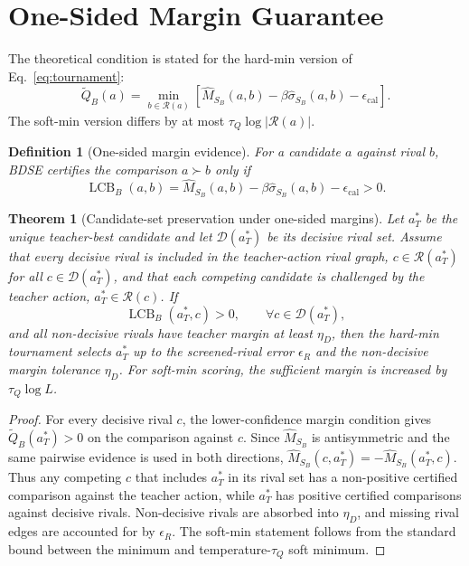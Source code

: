 \documentclass{article}
\newtheorem{theorem}{Theorem}
\newtheorem{definition}{Definition}
\newcommand{\R}{\mathcal{R}}
\begin{document}
\section{One-Sided Margin Guarantee}
\label{app:proof}

The theoretical condition is stated for the hard-min version of Eq.~\eqref{eq:tournament}:
\begin{equation}
\tilde Q_B(a)=\min_{b\in\R(a)}
\left[
\hat M_{S_B}(a,b)-\beta\hat\sigma_{S_B}(a,b)-\epsilon_{\mathrm{cal}}
\right].
\end{equation}
The soft-min version differs by at most $\tau_Q\log |\R(a)|$.

\begin{definition}[One-sided margin evidence]
For a candidate $a$ against rival $b$, BDSE certifies the comparison $a\succ b$ only if
\begin{equation}
\operatorname{LCB}_B(a,b)=
\hat M_{S_B}(a,b)-\beta\hat\sigma_{S_B}(a,b)-\epsilon_{\mathrm{cal}}>0.
\end{equation}
\end{definition}

\begin{theorem}[Candidate-set preservation under one-sided margins]
Let $a_T^*$ be the unique teacher-best candidate and let $\mathcal D(a_T^*)$ be its decisive rival set. Assume that every decisive rival is included in the teacher-action rival graph, $c\in\R(a_T^*)$ for all $c\in\mathcal D(a_T^*)$, and that each competing candidate is challenged by the teacher action, $a_T^*\in\R(c)$. If
\begin{equation}
\operatorname{LCB}_B(a_T^*,c)>0,
\qquad \forall c\in\mathcal D(a_T^*),
\end{equation}
and all non-decisive rivals have teacher margin at least $\eta_D$, then the hard-min tournament selects $a_T^*$ up to the screened-rival error $\epsilon_R$ and the non-decisive margin tolerance $\eta_D$. For soft-min scoring, the sufficient margin is increased by $\tau_Q\log L$.
\end{theorem}

\begin{proof}
For every decisive rival $c$, the lower-confidence margin condition gives $\tilde Q_B(a_T^*)>0$ on the comparison against $c$. Since $\hat M_{S_B}$ is antisymmetric and the same pairwise evidence is used in both directions, $\hat M_{S_B}(c,a_T^*)=-\hat M_{S_B}(a_T^*,c)$. Thus any competing $c$ that includes $a_T^*$ in its rival set has a non-positive certified comparison against the teacher action, while $a_T^*$ has positive certified comparisons against decisive rivals. Non-decisive rivals are absorbed into $\eta_D$, and missing rival edges are accounted for by $\epsilon_R$. The soft-min statement follows from the standard bound between the minimum and temperature-$\tau_Q$ soft minimum.
\end{proof}
\end{document}
